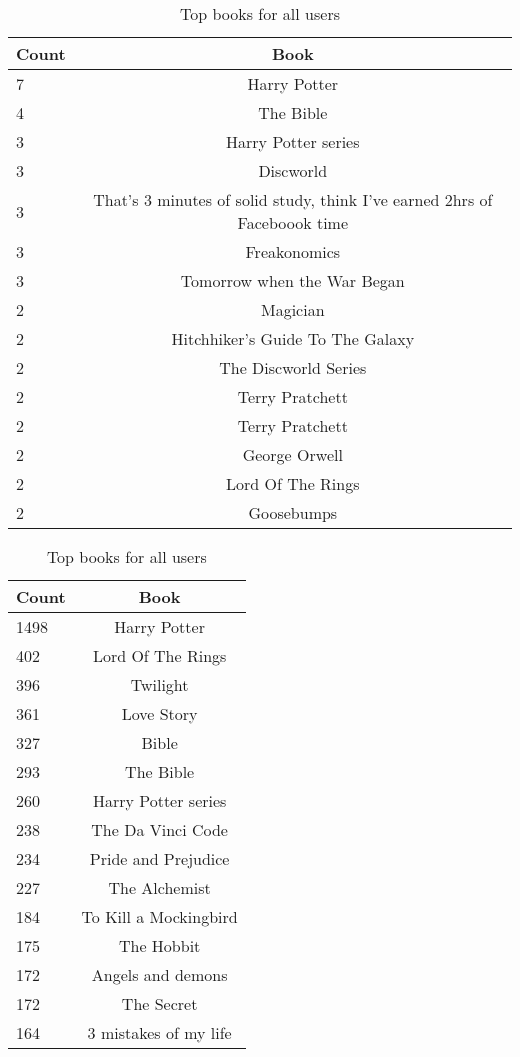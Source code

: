 \begin{table}[h]
\begin{minipage}[b]{.50\textwidth}
\centering
  \begin{tabular}{|l|c|} %
  \hline
  	\textbf{Count} & \textbf{Book} \\ \hline
		7 & Harry Potter \\ \hline
		4 & The Bible \\ \hline
		3 & Harry Potter series \\ \hline
		3 & Discworld \\ \hline
		3 & That's 3 minutes of solid study, think I've earned 2hrs of Faceboook time \\ \hline
		3 & Freakonomics \\ \hline
		3 & Tomorrow when the War Began \\ \hline
		2 & Magician \\ \hline
		2 & Hitchhiker's Guide To The Galaxy \\ \hline
		2 & The Discworld Series \\ \hline
		2 & Terry Pratchett \\ \hline
		2 & Terry Pratchett \\ \hline
		2 & George Orwell \\ \hline
		2 & Lord Of The Rings \\ \hline
		2 & Goosebumps \\ \hline
  \end{tabular}
  \caption{Top books for app users}
\end{minipage}
\begin{minipage}[b]{.50\textwidth}
\centering
  \begin{tabular}{|l|c|} %
  \hline
  		\textbf{Count} & \textbf{Book} \\ \hline
		1498 & Harry Potter \\ \hline
		402 & Lord Of The Rings \\ \hline
		396 & Twilight \\ \hline
		361 & Love Story \\ \hline
		327 & Bible \\ \hline
		293 & The Bible \\ \hline
		260 & Harry Potter series \\ \hline
		238 & The Da Vinci Code \\ \hline
		234 & Pride and Prejudice \\ \hline
		227 & The Alchemist \\ \hline
		184 & To Kill a Mockingbird \\ \hline
		175 & The Hobbit \\ \hline
		172 & Angels and demons \\ \hline
		172 & The Secret \\ \hline
		164 & 3 mistakes of my life \\ \hline
  \end{tabular}
  \caption{Top books for all users}
\end{minipage}
\end{table}



